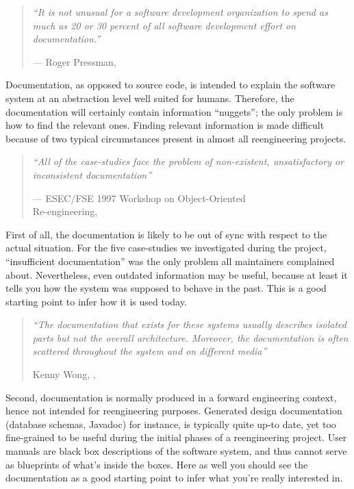 \documentclass[a4paper,10pt,twoside]{book}
\begin{document}
\begin{quotation}
\noindent
\emph{``It is not unusual for a software development organization to spend as much as 20 or 30 percent of all software development effort on documentation.''}

\hfill --- Roger Pressman, \cite{Pres94a} 
\end{quotation}

Documentation, as opposed to source code, is intended to explain the software system at an abstraction level well suited for humans. Therefore, the documentation will certainly contain information ``nuggets''; the only problem is how to find the relevant ones. Finding relevant information is made difficult because of two typical circumstances present in almost all reengineering projects.

\begin{quotation}
\noindent
\emph{``All of the case-studies face the problem of non-existent, unsatisfactory or inconsistent documentation''}

\noindent
--- ESEC/FSE 1997 Workshop on Object-Oriented \\
Re-engineering, \cite{Deme97a}
\end{quotation}

First of all, the documentation is likely to be out of sync with respect to the actual situation. For the five case-studies we investigated during the  project, ``insufficient documentation'' was the only problem all maintainers complained about. Nevertheless, even outdated information may be useful, because at least it tells you how the system was supposed to behave in the past. This is a good starting point to infer how it is used today.

\begin{quotation}
\noindent
\emph{``The documentation that exists for these systems usually describes isolated parts but not the overall architecture. Moreover, the documentation is often scattered throughout the system and on different media''}

\hfill Kenny Wong, \etal, \cite{Wong95a}
\end{quotation}

Second, documentation is normally produced in a forward engineering context, hence not intended for reengineering purposes. Generated design documentation (\eg database schemas, Javadoc) for instance, is typically quite up-to date, yet too fine-grained to be useful during the initial phases of a reengineering project. User manuals are black box descriptions of the software system, and thus cannot serve as blueprints of what's inside the boxes. Here as well you should see the documentation as a good starting point to infer what you're really interested in.
\end{document}
